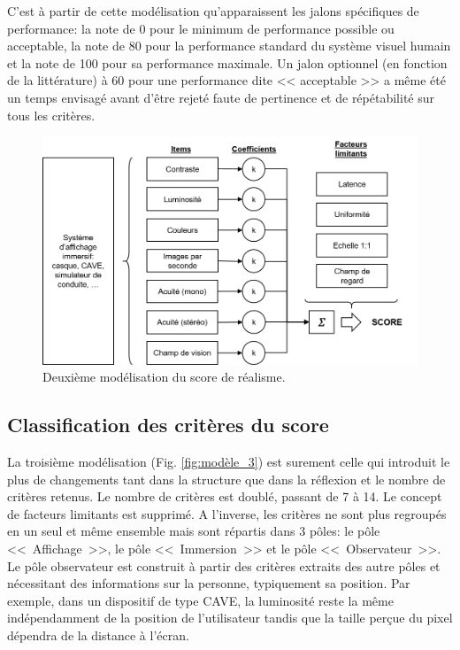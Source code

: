 	\par C'est à partir de cette modélisation qu'apparaissent les jalons spécifiques de performance: la note de 0 pour le minimum de performance possible ou acceptable, la note de 80 pour la performance standard du système visuel humain et la note de 100 pour sa performance maximale. Un jalon optionnel (en fonction de la littérature) à 60 pour une performance dite << acceptable >> a même été un temps envisagé avant d'être rejeté faute de pertinence et de répétabilité sur tous les critères.
	
	\begin{figure}
		\centering
		\includegraphics[scale=.8]{Figures/Modele2_2}
		\caption{Deuxième modélisation du score de réalisme.}
		\label{fig:modèle_2}
	\end{figure}
	
	\subsection{Classification des critères du score}
	\par La troisième modélisation (Fig. \ref{fig:modèle_3}) est surement celle qui introduit le plus de changements tant dans la structure que dans la réflexion et le nombre de critères retenus. Le nombre de critères est doublé, passant de 7 à 14. Le concept de facteurs limitants est supprimé. A l'inverse, les critères ne sont plus regroupés en un seul et même ensemble mais sont répartis dans 3 pôles: le pôle <<~Affichage~>>, le pôle <<~Immersion~>> et le pôle <<~Observateur~>>. Le pôle observateur est construit à partir des critères extraits des autre pôles et nécessitant des informations sur la personne, typiquement sa position. Par exemple, dans un dispositif de type CAVE, la luminosité reste la même indépendamment de la position de l'utilisateur tandis que la taille perçue du pixel dépendra de la distance à l'écran. 
	
